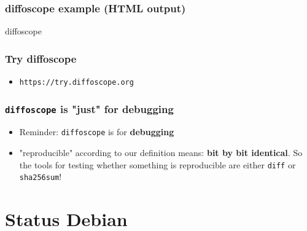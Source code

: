 \documentclass[14pt]{beamer}
\newif\ifplacelogo
\begin{document}
{\begin{frame}
 \frametitle{diffoscope example (HTML output)}
\end{frame}


\begin{frame}{diffoscope}
 \frametitle{Try diffoscope}
 \begin{itemize}
  \item \texttt{https://try.diffoscope.org}
 \end{itemize}
\end{frame}



\begin{frame}
 \frametitle{\texttt{diffoscope} is "just" for debugging}

 \begin{itemize}
  \item Reminder: \texttt{diffoscope} is for \textbf{debugging}
  \item<2> "reproducible" according to our definition means: \textbf{bit by bit
  identical}. So the tools for testing whether something is reproducible are
  either \texttt{diff} or \texttt{sha256sum}!
 \end{itemize}
\end{frame}

}

\placelogotrue

\section{Status Debian}
\end{document}
